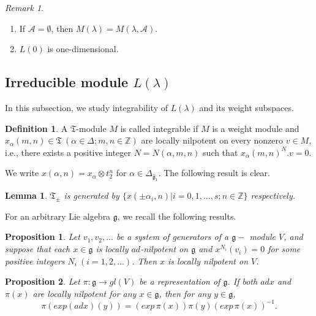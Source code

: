 \documentclass[11pt]{amsproc}
\newtheorem{lemma}[theorem]{Lemma}
\newtheorem{proposition}{Proposition}[section]
\theoremstyle{definition}
\newtheorem{definition}[theorem]{Definition}
\theoremstyle{remark}
\newtheorem{remark}[theorem]{Remark}
\numberwithin{equation}{section} \errorcontextlines=0
\begin{document}
\begin{remark}
\begin{enumerate}
\item If $\mathcal {A}=\emptyset$, then $M(\lambda)=M(\lambda,\mathcal
{A})$.
\item $L(0)$ is one-dimensional. \end{enumerate}
\end{remark}

\subsection{Irreducible module $L(\lambda)$} In this subsection,
we study integrability of $L({\lambda})$ and its weight subspaces.

\begin{definition}A $\mathfrak T$-module $M$ is called integrable if $M$
is a weight module and $x_{\alpha}(m,n)\in\mathfrak
T~(\alpha\in\Delta; m,n\in\mathbb{Z})$ are locally
nilpotent on every nonzero $v\in M$, i.e., there exists a positive integer
$N=N(\alpha,m,n)$ such that $x_{\alpha}(m,n)^{N}.v=0$.
\end{definition}

We write $x(\alpha,n)=x_{\alpha}\otimes t_2^n$ for
$\alpha\in\Delta_{\hat{\mathfrak g}_1}$. The following result is clear.

\begin{lemma}\label{L:gen1} $\mathfrak T_{\pm}$ is generated by
$\{x(\pm\alpha_i,n)|i=0,1,\ldots,s; n\in\mathbb{Z}\}$ respectively.

\end{lemma}

For an arbitrary Lie algebra $\mathfrak{g}$, we recall the following
results.
\begin{proposition}\cite{VG}\label {5}
Let $v_1,v_2,\ldots $ be a system of generators of a $\mathfrak{g}-$
module $V$, and suppose that each $x\in \mathfrak{g}$ is locally $ad$-nilpotent
on $\mathfrak{g}$ and $x^{N_i}(v_i)=0$ for some
positive integers $N_i~(i=1,2,\ldots)$. Then $x$ is locally
nilpotent on $V$.
\end{proposition}

\begin{proposition}\cite{MP}\label {6}
Let $\pi:\mathfrak{g}\rightarrow gl(V)$ be a representation of
$\mathfrak{g}$. If both $ad x$ and $\pi(x)$ are locally nilpotent
for any $x\in\mathfrak g$, then for any $y\in \mathfrak{g}$, \begin{equation}
\pi(exp(ad x)(y))=(exp\, \pi(x))\pi(y)(exp\, \pi(x))^{-1}.
\end{equation}
\end{proposition}
\end{document}
